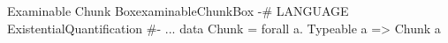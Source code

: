 \begin{pseudohaskell}{Examinable Chunk Box}{examinableChunkBox}
{-# LANGUAGE ExistentialQuantification #-}
...
data Chunk = forall a. Typeable a => Chunk a
\end{pseudohaskell}
